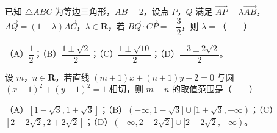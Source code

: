 \begin{question}
已知 $\triangle ABC$ 为等边三角形，$AB=2$，设点 $P$，$Q$ 满足 $\overrightarrow{AP}=\lambda\overrightarrow{AB}$，$\overrightarrow{AQ}=(1-\lambda)\overrightarrow{AC}$，$\lambda\in\mathbf R$，若 $\overrightarrow{BQ}\cdot\overrightarrow{CP}=-\dfrac32$，则 $\lambda=$\mbox{（　　）}

（A）$\dfrac12$；（B）$\dfrac{1\pm\sqrt2}2$；（C）$\dfrac{1\pm\sqrt{10}}2$；（D）$\dfrac{-3\pm2\sqrt2}2$。

\end{question}
\begin{question}
设 $m$，$n\in\mathbf R$，若直线 $(m+1)x+(n+1)y-2=0$ 与圆 $(x-1)^2+(y-1)^2=1$ 相切，则 $m+n$ 的取值范围是\mbox{（　　）}

（A）$[1-\sqrt3,1+\sqrt3]$；（B）$(-\infty,1-\sqrt3]\cup[1+\sqrt3,+\infty)$；（C）$[2-2\sqrt2,2+2\sqrt2]$；（D）$(-\infty,2-2\sqrt2]\cup[2+2\sqrt2,+\infty)$。

\end{question}

